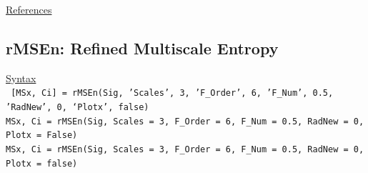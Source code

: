 \documentclass[12pt, a4paper, titlepage, openany]{book}
\begin{document}
\noindent \ul{References}\hspace{1cm}
\cite{MS1} \cite{MS2} \cite{MS3} \cite{cMS1} \cite{cMS2} 



\newpage
\subsection{\normalsize rMSEn: \hspace{15mm} Refined Multiscale Entropy}
\noindent\ul{Syntax} \vspace{6mm} \\ \noindent \texttt{\footnotesize
[MSx, Ci] = rMSEn(Sig, 'Scales', 3, 'F\_Order', 6, 'F\_Num', 0.5, 'RadNew', 0, ‘Plotx’, false)\\
MSx, Ci = rMSEn(Sig, Scales = 3, F\_Order = 6, F\_Num = 0.5, RadNew = 0, Plotx = False)\\ 
MSx, Ci = rMSEn(Sig, Scales = 3, F\_Order = 6, F\_Num = 0.5, RadNew = 0, Plotx = false)}
\end{document}

